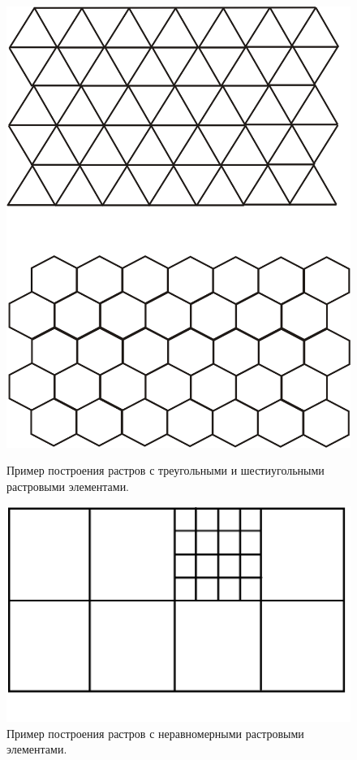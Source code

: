 \begin{figure}[H]
    \begin{center}
        \begin{minipage}[h]{0.4\linewidth}
            \includegraphics[width=1\linewidth]{r_tr_ge.png}
            \caption{Пример построения растров с треугольными и шестиугольными растровыми элементами.}
            \label{ris:image1}
        \end{minipage}
        \hfill
        \begin{minipage}[H]{0.4\linewidth}
            \includegraphics[width=1\textwidth]{r_ner1.png}
            \caption{Пример построения растров с неравномерными растровыми элементами.}
            \label{ris:image2}


\end{minipage}
\end{center}
\end{figure}
